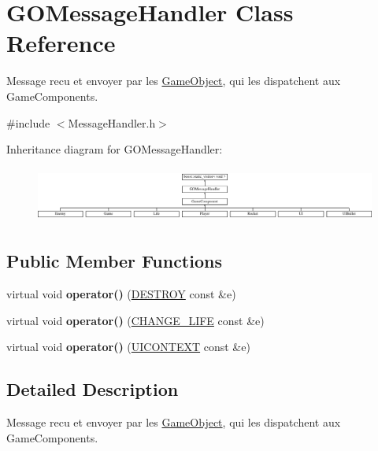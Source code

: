 \hypertarget{class_g_o_message_handler}{}\section{G\+O\+Message\+Handler Class Reference}
\label{class_g_o_message_handler}


Message recu et envoyer par les \hyperlink{class_game_object}{Game\+Object}, qui les dispatchent aux Game\+Components.  




{\ttfamily \#include $<$Message\+Handler.\+h$>$}

Inheritance diagram for G\+O\+Message\+Handler\+:\begin{figure}[H]
\begin{center}
\leavevmode
\includegraphics[height=1.839080cm]{class_g_o_message_handler}
\end{center}
\end{figure}
\subsection*{Public Member Functions}
\begin{DoxyCompactItemize}
\item 
\hypertarget{class_g_o_message_handler_a56185d82155d3917c046327978872668}{}\label{class_g_o_message_handler_a56185d82155d3917c046327978872668} 
virtual void {\bfseries operator()} (\hyperlink{struct_d_e_s_t_r_o_y}{D\+E\+S\+T\+R\+OY} const \&e)
\item 
\hypertarget{class_g_o_message_handler_a2fd424c1de0a2a7ed1b8d14f36a3fd57}{}\label{class_g_o_message_handler_a2fd424c1de0a2a7ed1b8d14f36a3fd57} 
virtual void {\bfseries operator()} (\hyperlink{struct_c_h_a_n_g_e___l_i_f_e}{C\+H\+A\+N\+G\+E\+\_\+\+L\+I\+FE} const \&e)
\item 
\hypertarget{class_g_o_message_handler_abb5fd98aec67539124ba38a95f0f3ef1}{}\label{class_g_o_message_handler_abb5fd98aec67539124ba38a95f0f3ef1} 
virtual void {\bfseries operator()} (\hyperlink{struct_u_i_c_o_n_t_e_x_t}{U\+I\+C\+O\+N\+T\+E\+XT} const \&e)
\end{DoxyCompactItemize}


\subsection{Detailed Description}
Message recu et envoyer par les \hyperlink{class_game_object}{Game\+Object}, qui les dispatchent aux Game\+Components. 



